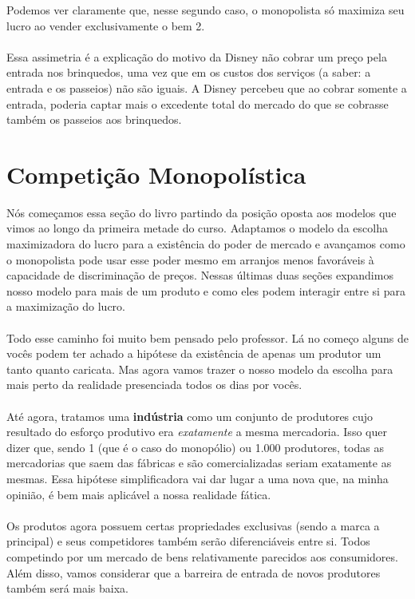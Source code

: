 \documentclass[a4paper,11pt,oneside]{book}
\theoremstyle{definition}
\theoremstyle{break}
\begin{document}
Podemos ver claramente que, nesse segundo caso, o monopolista só maximiza seu lucro ao vender exclusivamente o bem 2.
\\~\\
Essa assimetria é a explicação do motivo da Disney não cobrar um preço pela entrada nos brinquedos, uma vez que em os custos dos serviços (a saber: a entrada e os passeios) não são iguais. A Disney percebeu que ao cobrar somente a entrada, poderia captar mais o excedente total do mercado do que se cobrasse também os passeios aos brinquedos.

\section{Competição Monopolística}

Nós começamos essa seção do livro partindo da posição oposta aos modelos que vimos ao longo da primeira metade do curso. Adaptamos o modelo da escolha maximizadora do lucro para a existência do poder de mercado e avançamos como o monopolista pode usar esse poder mesmo em arranjos menos favoráveis à capacidade de discriminação de preços. Nessas últimas duas seções expandimos nosso modelo para mais de um produto e como eles podem interagir entre si para a maximização do lucro.
\\~\\
Todo esse caminho foi muito bem pensado pelo professor. Lá no começo alguns de vocês podem ter achado a hipótese da existência de apenas um produtor um tanto quanto caricata. Mas agora vamos trazer o nosso modelo da escolha para mais perto da realidade presenciada todos os dias por vocês.
\\~\\
Até agora, tratamos uma \textbf{indústria} como um conjunto de produtores cujo resultado do esforço produtivo era \textit{exatamente} a mesma mercadoria. Isso quer dizer que, sendo 1 (que é o caso do monopólio) ou 1.000 produtores, todas as mercadorias que saem das fábricas e são comercializadas seriam exatamente as mesmas. Essa hipótese simplificadora vai dar lugar a uma nova que, na minha opinião, é bem mais aplicável a nossa realidade fática.
\\~\\
Os produtos agora possuem certas propriedades exclusivas (sendo a marca a principal) e seus competidores também serão diferenciáveis entre si. Todos competindo por um mercado de bens relativamente parecidos aos consumidores. Além disso, vamos considerar que a barreira de entrada de novos produtores também será mais baixa.
\end{document}
